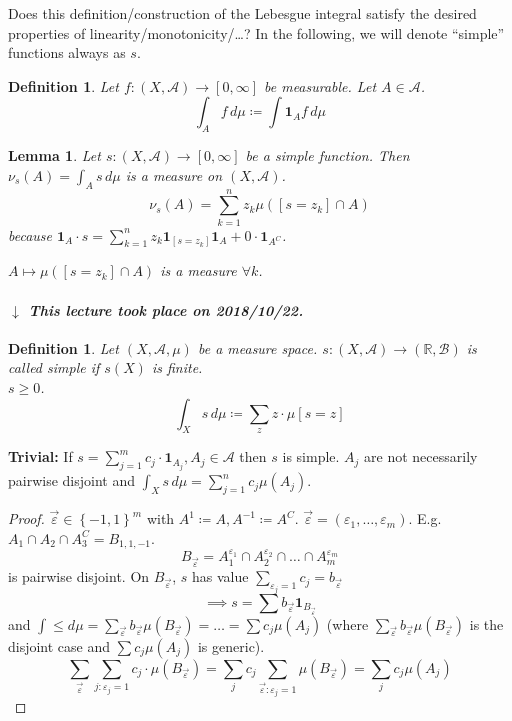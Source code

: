 \documentclass[a4paper]{article}
\newcounter{lecref}[section]
\numberwithin{lecref}{section}
\theoremstyle{break}
\newtheorem{definition}[lecref]{Definition}
\newtheorem{lemma}[lecref]{Lemma}
\newcommand{\dateref}[1]{%
  \begin{mdframed}[backgroundcolor=gray!10,innerbottommargin=0pt,innertopmargin=0pt]
    \paragraph{\textit{$\downarrow$ This lecture took place on #1.}}%
  \end{mdframed}%
}
\newcommand{\Set}[1]{\left\{#1\right\}}
\def\vec2#1#2{\begin{pmatrix} #1 \\ #2 \end{pmatrix}}
\def\vec3#1#2#3{\begin{pmatrix} #1 \\ #2 \\ #3 \end{pmatrix}}
\begin{document}
Does this definition/construction of the Lebesgue integral satisfy the desired properties of linearity/monotonicity/\dots?
In the following, we will denote \enquote{simple} functions always as $s$.

\begin{definition}
  Let $f: (X, \mathcal A) \to [0, \infty]$ be measurable.
  Let $A \in \mathcal A$.
  \[ \int_A f \, d\mu \coloneqq \int \mathbf 1_A f \, d\mu \]
\end{definition}

\begin{lemma}
  Let $s: (X, \mathcal A) \to [0, \infty]$ be a simple function.
  Then $\nu_s(A) = \int_A s \, d\mu$ is a measure on $(X, \mathcal A)$.
  \[ \nu_s(A) = \sum_{k=1}^n z_k \mu([s = z_k] \cap A) \]
  because $\mathbf 1_A \cdot s = \sum_{k=1}^n z_k \mathbf 1_{[s = z_k]} \mathbf 1_A + 0 \cdot \mathbf 1_{A^C}$.

  $A \mapsto \mu([s = z_k] \cap A)$ is a measure $\forall k$.
\end{lemma}

\dateref{2018/10/22}

\begin{definition}
  Let $(X, \mathcal A, \mu)$ be a measure space.
  $s: (X, \mathcal A) \to (\mathbb R, \mathcal B)$ is called \emph{simple}
  if $s(X)$ is finite. \\
  $s \geq 0$.
  \[ \int_X s \, d\mu \coloneqq \sum_z z \cdot \mu[s = z] \]
\end{definition}

\textbf{Trivial:} If $s = \sum_{j=1}^m c_j \cdot \mathbf 1_{A_j}, A_j \in \mathcal A$
then $s$ is simple. $A_j$ are not necessarily pairwise disjoint
and $\int_X s \, d\mu = \sum_{j=1}^n c_j \mu(A_j)$.

\begin{proof}
  $\vec{\varepsilon} \in \Set{-1, 1}^m$ with $A^1 \coloneqq A, A^{-1} \coloneqq A^C$. $\vec{\varepsilon} = (\varepsilon_1, \dots, \varepsilon_m)$. E.g. $A_1 \cap A_2 \cap A_3^C = B_{1,1,-1}$.
  \[ B_{\vec{\varepsilon}} = A_1^{\varepsilon_1} \cap A_2^{\varepsilon_2} \cap \dots \cap A_m^{\varepsilon_m} \]
  is pairwise disjoint. On $B_{\vec{\varepsilon}}$, $s$ has value $\sum_{\varepsilon_j = 1} c_j = b_{\vec{\varepsilon}}$
  \[ \implies s = \sum b_{\vec{\varepsilon}} \mathbf{1}_{B_{\vec{\varepsilon}}} \]
  and $\int \leq d\mu = \sum_{\vec{\varepsilon}} b_{\vec{\varepsilon}} \mu(B_{\vec{\varepsilon}}) = \dots = \sum c_j \mu(A_j)$ (where $\sum_{\vec{\varepsilon}} b_{\vec{\varepsilon}} \mu(B_{\vec{\varepsilon}})$ is the disjoint case and $\sum c_j \mu(A_j)$ is generic).
  \[
    \sum_{\vec{\varepsilon}} \sum_{j: \varepsilon_j = 1} c_j \cdot \mu(B_{\vec{\varepsilon}})
    = \sum_j c_j \sum_{\vec{\varepsilon}: \varepsilon_j = 1} \mu(B_{\vec{\varepsilon}})
    = \sum_j c_j \mu(A_j)
  \]
\end{proof}
\end{document}
